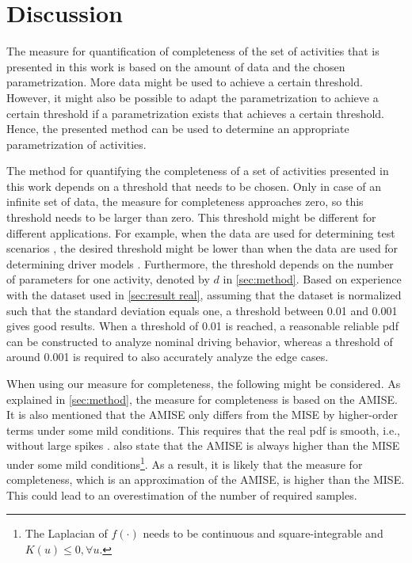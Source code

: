 \section{Discussion}
\label{sec:discussion}

The measure for quantification of completeness of the set of activities that is presented in this work is based on the amount of data and the chosen parametrization. More data might be used to achieve a certain threshold. However, it might also be possible to adapt the parametrization to achieve a certain threshold if a parametrization exists that achieves a certain threshold. Hence, the presented method can be used to determine an appropriate parametrization of activities.

The method for quantifying the completeness of a set of activities presented in this work depends on a threshold that needs to be chosen. \cstart Only in case of an infinite set of data, the measure for completeness approaches zero, so this threshold needs to be larger than zero. \cend This threshold might be different for different applications. For example, when the data are used for determining test scenarios \cite{elrofai2018scenario, ploeg2018cetran}, the desired threshold might be lower than when the data are used for determining driver models \cite{wang2017much, sadigh2014data}. \cstart Furthermore, the threshold depends on the number of parameters for one activity, denoted by $d$ in \cref{sec:method}. Based on experience with the dataset used in \cref{sec:result real}, assuming that the dataset is normalized such that the standard deviation equals one, a threshold between 0.01 and 0.001 gives good results. When a threshold of 0.01 is reached, a reasonable reliable pdf can be constructed to analyze nominal driving behavior, whereas a threshold of around 0.001 is required to also accurately analyze the edge cases. 
\cend

\cstart
When using our measure for completeness, the following might be considered. As explained in \cref{sec:method}, the measure for completeness is based on the AMISE. It is also mentioned that the AMISE only differs from the MISE by higher-order terms under some mild conditions. This requires that the real pdf is smooth, i.e., without large spikes \cite{marron1992exact}. \textcite{marron1992exact} also state that the AMISE is always higher than the MISE under some mild conditions\footnote{The Laplacian of $f(\cdot)$ needs to be continuous and square-integrable and $K(u) \leq 0, \forall u$.}. As a result, it is likely that the measure for completeness, which is an approximation of the AMISE, is higher than the MISE. This could lead to an overestimation of the number of required samples.
\cend

